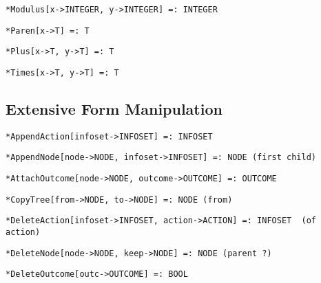 \protect \large \begin{verbatim}
*Modulus[x->INTEGER, y->INTEGER] =: INTEGER
\end{verbatim}\normalsize

\protect \large \begin{verbatim}
*Paren[x->T] =: T
\end{verbatim}\normalsize

\protect \large \begin{verbatim}
*Plus[x->T, y->T] =: T
\end{verbatim} \normalsize

\protect \large \begin{verbatim}
*Times[x->T, y->T] =: T
\end{verbatim} \normalsize

\medskip
\subsection{Extensive Form Manipulation}

\protect \large \begin{verbatim}
*AppendAction[infoset->INFOSET] =: INFOSET
\end{verbatim}\normalsize

\protect \large \begin{verbatim} 
*AppendNode[node->NODE, infoset->INFOSET] =: NODE (first child)
\end{verbatim}\normalsize

\protect \large \begin{verbatim} 
*AttachOutcome[node->NODE, outcome->OUTCOME] =: OUTCOME
\end{verbatim}\normalsize

\protect \large \begin{verbatim}
*CopyTree[from->NODE, to->NODE] =: NODE (from)
\end{verbatim}\normalsize

\protect \large \begin{verbatim}
*DeleteAction[infoset->INFOSET, action->ACTION] =: INFOSET  (of action)
\end{verbatim}\normalsize

\protect \large \begin{verbatim}
*DeleteNode[node->NODE, keep->NODE] =: NODE (parent ?)  
\end{verbatim}\normalsize

\protect \large \begin{verbatim}
*DeleteOutcome[outc->OUTCOME] =: BOOL
\end{verbatim}\normalsize

